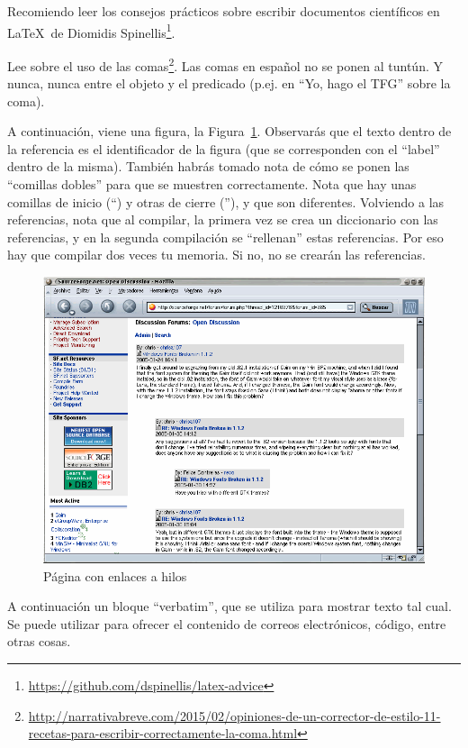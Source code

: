 



















Recomiendo leer los consejos prácticos sobre escribir documentos científicos en \LaTeX \ de Diomidis Spinellis\footnote{\url{https://github.com/dspinellis/latex-advice}}.

Lee sobre el uso de las comas\footnote{\url{http://narrativabreve.com/2015/02/opiniones-de-un-corrector-de-estilo-11-recetas-para-escribir-correctamente-la-coma.html}}. 
Las comas en español no se ponen al tuntún.
Y nunca, nunca entre el objeto y el predicado (p.ej. en ``Yo, hago el TFG'' sobre la coma).

A continuación, viene una figura, la Figura~\ref{figura:foro_hilos}. 
Observarás que el texto dentro de la referencia es el identificador de la figura (que se corresponden con el ``label'' dentro de la misma). 
También habrás tomado nota de cómo se ponen las ``comillas dobles'' para que se muestren correctamente. 
Nota que hay unas comillas de inicio (``) y otras de cierre (''), y que son diferentes.
Volviendo a las referencias, nota que al compilar, la primera vez se crea un diccionario con las referencias, y en la segunda compilación se ``rellenan'' estas referencias. 
Por eso hay que compilar dos veces tu memoria.
Si no, no se crearán las referencias.

 \begin{figure}
    \centering
    \includegraphics[bb=0 0 800 600, width=12cm, keepaspectratio]{img/foro1}
    \caption{Página con enlaces a hilos}
    \label{figura:foro_hilos}
 \end{figure}

A continuación un bloque ``verbatim'', que se utiliza para mostrar texto tal cual.
Se puede utilizar para ofrecer el contenido de correos electrónicos, código, entre otras cosas.






